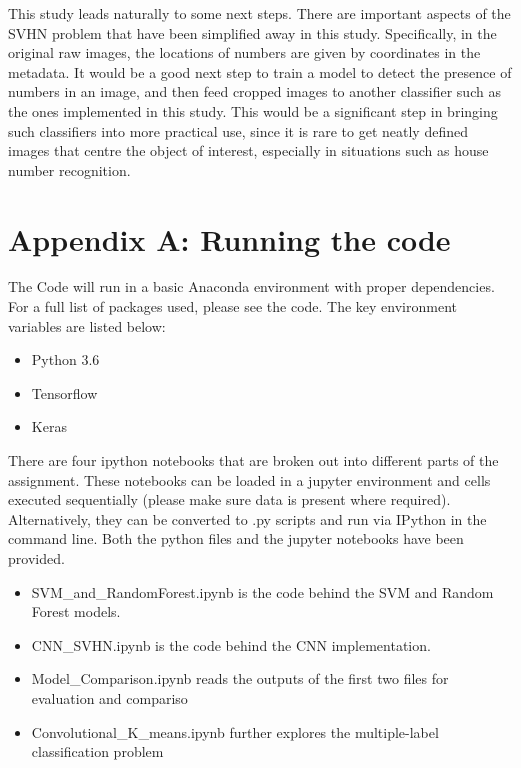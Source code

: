 \documentclass[12pt]{article}
\begin{document}
This study leads naturally to some next steps. There are important aspects of the SVHN problem that have been simplified away in this study. Specifically, in the original raw images, the locations of numbers are given by coordinates in the metadata. It would be a good next step to train a model to detect the presence of numbers in an image, and then feed cropped images to another classifier such as the ones implemented in this study. This would be a significant step in bringing such classifiers into more practical use, since it is rare to get neatly defined images that centre the object of interest, especially in situations such as house number recognition.\\

\medskip
\newpage

\appendix
\section{Appendix A: Running the code}
The Code will run in a basic Anaconda environment with proper dependencies. For a full list of packages used, please see the code. The key environment variables are listed below:
\begin{itemize}
  \item Python 3.6
  \item Tensorflow
  \item Keras
\end{itemize}

There are four ipython notebooks that are broken out into different parts of the assignment. These notebooks can be loaded in a jupyter environment and cells executed sequentially (please make sure data is present where required). Alternatively, they can be converted to .py scripts and run via IPython in the command line. Both the python files and the jupyter notebooks have been provided.
\begin{itemize}
  \item SVM\_and\_RandomForest.ipynb is the code behind the SVM and Random Forest models.
  \item CNN\_SVHN.ipynb is the code behind the CNN implementation.
  \item Model\_Comparison.ipynb reads the outputs of the first two files for evaluation and compariso
  \item Convolutional\_K\_means.ipynb further explores the multiple-label classification problem
\end{itemize}
\end{document}
